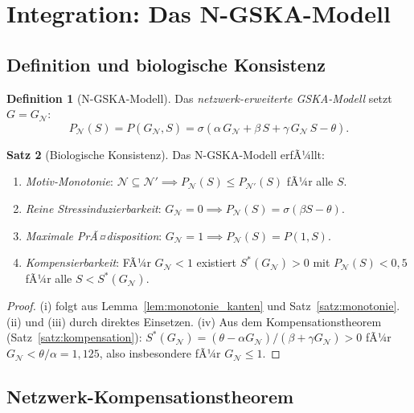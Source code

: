 ﻿\documentclass[12pt, a4paper]{article}
\theoremstyle{definition}
\newtheorem{definition}{Definition}[section]
\newtheorem{satz}[definition]{Satz}
\theoremstyle{remark}
\newcommand{\calN}{\mathcal{N}}
\newcommand{\GN}{G_{\calN}}
\begin{document}
\section{Integration: Das N-GSKA-Modell}
\label{sec:integration}


\subsection{Definition und biologische Konsistenz}

\begin{definition}[N-GSKA-Modell]
\label{def:ngska}
Das \emph{netzwerk-erweiterte GSKA-Modell} setzt $G = \GN$:
\[
  P_\calN(S) = P(\GN, S) = \sigma(\alpha\,\GN + \beta\,S + \gamma\,\GN\,S - \theta).
\]
\end{definition}

\begin{satz}[Biologische Konsistenz]
\label{satz:konsistenz}
Das N-GSKA-Modell erfÃ¼llt:
\begin{enumerate}[label=(\roman*)]
  \item \emph{Motiv-Monotonie}: $\calN \subseteq \calN' \implies
    P_\calN(S) \leq P_{\calN'}(S)$ fÃ¼r alle $S$.
  \item \emph{Reine Stressinduzierbarkeit}: $\GN = 0 \implies
    P_\calN(S) = \sigma(\beta S - \theta)$.
  \item \emph{Maximale PrÃ¤disposition}: $\GN = 1 \implies
    P_\calN(S) = P(1,S)$.
  \item \emph{Kompensierbarkeit}: FÃ¼r $\GN < 1$ existiert
    $S^*(\GN) > 0$ mit $P_\calN(S) < 0{,}5$ fÃ¼r alle $S < S^*(\GN)$.
\end{enumerate}
\end{satz}

\begin{proof}
(i) folgt aus Lemma~\ref{lem:monotonie_kanten} und Satz~\ref{satz:monotonie}.
(ii) und (iii) durch direktes Einsetzen.
(iv) Aus dem Kompensationstheorem (Satz~\ref{satz:kompensation}):
$S^*(\GN) = (\theta - \alpha\GN)/(\beta + \gamma\GN) > 0$
fÃ¼r $\GN < \theta/\alpha = 1{,}125$, also insbesondere fÃ¼r $\GN \leq 1$.
\end{proof}

\subsection{Netzwerk-Kompensationstheorem}
\end{document}
